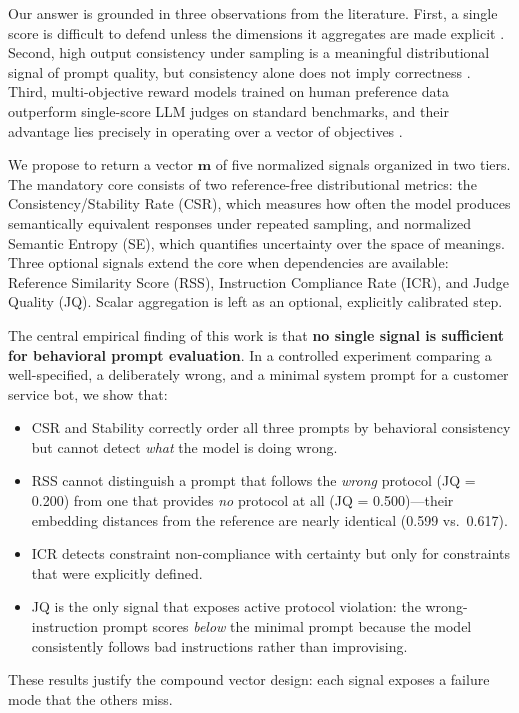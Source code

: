 \documentclass[11pt,a4paper]{article}
\begin{document}
Our answer is grounded in three observations from the literature. First, a single score is difficult to defend unless the dimensions it aggregates are made explicit \citep{unieval2022}. Second, high output consistency under sampling is a meaningful distributional signal of prompt quality, but consistency alone does not imply correctness \citep{selfconsistency2023, glape2024}. Third, multi-objective reward models trained on human preference data outperform single-score LLM judges on standard benchmarks, and their advantage lies precisely in operating over a vector of objectives \citep{armorm2024}.

We propose to return a vector $\mathbf{m}$ of five normalized signals organized in two tiers. The mandatory core consists of two reference-free distributional metrics: the Consistency/Stability Rate (CSR), which measures how often the model produces semantically equivalent responses under repeated sampling, and normalized Semantic Entropy (SE), which quantifies uncertainty over the space of meanings. Three optional signals extend the core when dependencies are available: Reference Similarity Score (RSS), Instruction Compliance Rate (ICR), and Judge Quality (JQ). Scalar aggregation is left as an optional, explicitly calibrated step.

The central empirical finding of this work is that \textbf{no single signal is sufficient for behavioral prompt evaluation}. In a controlled experiment comparing a well-specified, a deliberately wrong, and a minimal system prompt for a customer service bot, we show that:
\begin{itemize}[noitemsep]
    \item CSR and Stability correctly order all three prompts by behavioral consistency but cannot detect \textit{what} the model is doing wrong.
    \item RSS cannot distinguish a prompt that follows the \textit{wrong} protocol (JQ = 0.200) from one that provides \textit{no} protocol at all (JQ = 0.500)---their embedding distances from the reference are nearly identical (0.599 vs.\ 0.617).
    \item ICR detects constraint non-compliance with certainty but only for constraints that were explicitly defined.
    \item JQ is the only signal that exposes active protocol violation: the wrong-instruction prompt scores \textit{below} the minimal prompt because the model consistently follows bad instructions rather than improvising.
\end{itemize}
These results justify the compound vector design: each signal exposes a failure mode that the others miss.
\end{document}
